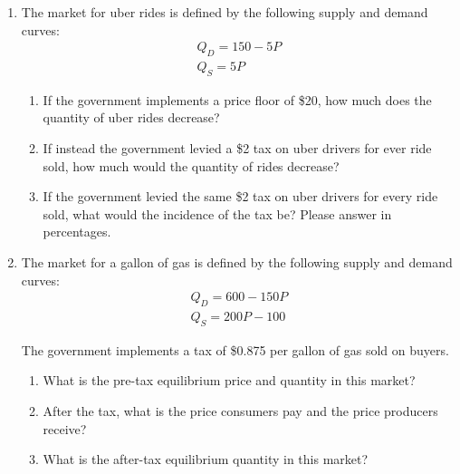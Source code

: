 \documentclass{article}
\begin{document}
\begin{enumerate}
	If the government implements a price ceiling of \$300, how much does the quantity of tutoring decrease?
	
\item The market for uber rides is defined by the following supply and demand curves:
	\begin{gather*}
	Q_D = 150 - 5P \\
	Q_S = 5P
	\end{gather*}
	
	\begin{enumerate}
	
	\item If the government implements a price floor of \$20, how much does the quantity of uber rides decrease?
	
	\item If instead the government levied a \$2 tax on uber drivers for ever ride sold, how much would the quantity of rides decrease?
	
	\item If the government levied the same \$2 tax on uber drivers for every ride sold, what would the incidence of the tax be? Please answer in percentages.
	
	\end{enumerate}
	
\item The market for a gallon of gas is defined by the following supply and demand curves:
	\begin{gather*}
	Q_D = 600 - 150P \\
	Q_S = 200P - 100
	\end{gather*}
	
	The government implements a tax of \$0.875 per gallon of gas sold on buyers. 
	
	\begin{enumerate}
	
	\item What is the pre-tax equilibrium price and quantity in this market?
	
	\item After the tax, what is the price consumers pay and the price producers receive?
	
	\item What is the after-tax equilibrium quantity in this market? 
	
	\end{enumerate}
	
\end{enumerate}
\end{document}
